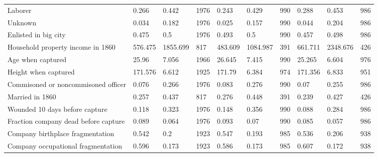 \documentclass[a4paper]{report}\usepackage{graphicx, color}
\begin{document}
\begin{refsection}
\begin{table}
\begin{tabular}{llllllllll}
Laborer                           & 0.266                   & 0.442                                & 1976                                   & 0.243 & 0.429 & 990 & 0.288 & 0.453 & 986 \\
Unknown                           & 0.034                   & 0.182                                & 1976                                   & 0.025 & 0.157 & 990 & 0.044 & 0.204 & 986 \\
Enlisted in big city              & 0.475                   & 0.5                                  & 1976                                   & 0.493 & 0.5 & 990 & 0.457 & 0.498 & 986 \\
Household property income in 1860 & 576.475                 & 1855.699                             & 817                                    & 483.609 & 1084.987 & 391 & 661.711 & 2348.676 & 426 \\
Age when captured                 & 25.96                   & 7.056                                & 1966                                   & 26.645 & 7.415 & 990 & 25.265 & 6.604 & 976 \\
Height when captured                 & 171.576 & 6.612 & 1925 & 171.79 & 6.384 & 974 & 171.356 & 6.833 & 951 \\
Commisoned or noncommisoned officer  & 0.076   & 0.266 & 1976 & 0.083  & 0.276 & 990 & 0.07    & 0.255 & 986 \\
Married in 1860                      & 0.257   & 0.437 & 817  & 0.276  & 0.448 & 391 & 0.239   & 0.427 & 426 \\
Wounded 10 days before capture       & 0.118   & 0.323 & 1976 & 0.148  & 0.356 & 990 & 0.088   & 0.284 & 986 \\
Fraction company dead before capture & 0.089   & 0.064 & 1976 & 0.093  & 0.07  & 990 & 0.085   & 0.057 & 986 \\
Company birthplace fragmentation     & 0.542   & 0.2   & 1923 & 0.547  & 0.193 & 985 & 0.536   & 0.206 & 938 \\
Company occupational fragmentation   & 0.596   & 0.173 & 1923 & 0.586  & 0.173 & 985 & 0.607   & 0.172 & 938 \\
\end{tabular}
\end{table}


\end{refsection}
\end{document}
